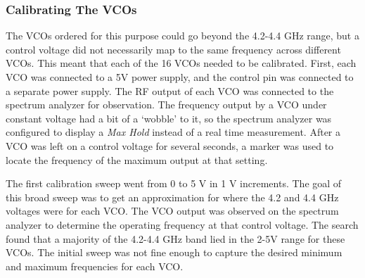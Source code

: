 \subsubsection{Calibrating The VCOs}
The VCOs ordered for this purpose could go beyond the 4.2-4.4 GHz range, but a control voltage did not necessarily map to the same frequency across different VCOs. This meant that each of the 16 VCOs needed to be calibrated. First, each VCO was connected to a 5V power supply, and the control pin was connected to a separate power supply. The RF output of each VCO was connected to the spectrum analyzer for observation. The frequency output by a VCO under constant voltage had a bit of a `wobble' to it, so the spectrum analyzer was configured to display a \textit{Max Hold} instead of a real time measurement. After a VCO was left on a control voltage for several seconds, a marker was used to locate the frequency of the maximum output at that setting. 

The first calibration sweep went from 0 to 5 V in 1 V increments.  The goal of this broad sweep was to get an approximation for where the 4.2 and 4.4 GHz voltages were for each VCO. The VCO output was observed on the spectrum analyzer to determine the operating frequency at that control voltage. The search found that a majority of the 4.2-4.4 GHz band lied in the 2-5V range for these VCOs. The initial sweep was not fine enough to capture the desired minimum and maximum frequencies for each VCO. 



